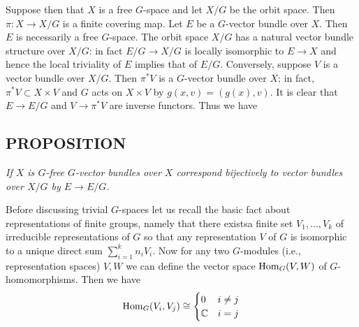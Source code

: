 Suppose then that $X$ is a free $G$-space and let $X/G$ be the orbit space. Then $\pi: X \to X/G$ is a finite covering map. Let $E$ be a $G$-vector bundle over $X$. Then $E$ is necessarily a free $G$-space. The orbit space $X/G$ has a natural vector bundle structure over $X/G$: in fact $E/G \to X/G$ is locally isomorphic to $E \to X$ and hence the local triviality of $E$ implies that of $E/G$. Conversely, suppose $V$ is a vector bundle over $X/G$. Then $\pi^*V$ is a $G$-vector bundle over $X$; in fact, $\pi^*V \subset X \times V$ and $G$ acts on $X \times V$ by $g(x, v) = (g(x), v)$. It is clear that $E \to E/G$ and $V \to \pi^*V$ are inverse functors. Thus we have

\subsection{PROPOSITION}\label{prop:1.6.1} \textit{If $X$ is $G$-free $G$-vector bundles over $X$ correspond bijectively to vector bundles over $X/G$ by $E \to E/G$.} \par 

Before discussing trivial $G$-spaces let us recall the basic fact about representations of finite groups, namely that there existsa finite set $V_1, \ldots, V_k$ of irreducible representations of $G$ so that any representation $V$ of $G$ is isomorphic to a unique direct sum $\sum_{i=1}^k n_i V_i$. Now for any two $G$-modules (i.e., representation spaces) $V, W$ we can define the vector space $\operatorname{Hom}_G(V, W)$ of $G$-homomorphisms. Then we have
\begin{equation*}
\operatorname{Hom}_G(V_i, V_j) \cong
    \begin{cases}
        0          & i \neq j \\
        \mathbb{C} & i = j
    \end{cases}
\end{equation*}

